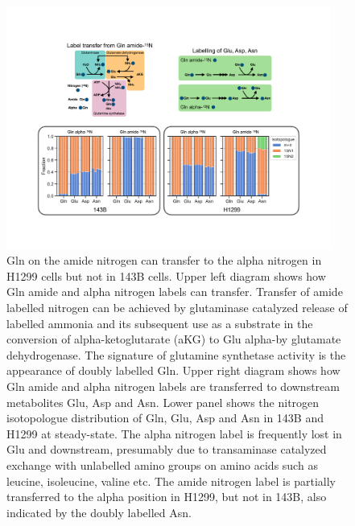 \begin{figure}
    \centering
    \includegraphics[width=0.95\textwidth]{figures/chap2/app/gln_lab_tranfr.pdf}
    \caption[Gln amide to alpha \hNi{} transfer.]{
    Gln \hNi{} on the amide nitrogen can transfer to the alpha nitrogen in H1299 cells but not in 143B cells.
    Upper left diagram shows how Gln amide and alpha nitrogen labels can transfer.
    Transfer of amide labelled nitrogen can be achieved by glutaminase catalyzed release of labelled ammonia and its subsequent use as a substrate in the conversion of alpha-ketoglutarate (aKG) to Glu alpha-\hNi by glutamate dehydrogenase.
    The signature of glutamine synthetase activity is the appearance of doubly labelled Gln.
    Upper right diagram shows how Gln amide and alpha nitrogen labels are transferred to downstream metabolites Glu, Asp and Asn.
    Lower panel shows the nitrogen isotopologue distribution of Gln, Glu, Asp and Asn in 143B and H1299 at steady-state.
    The alpha nitrogen label is frequently lost in Glu and downstream, presumably due to transaminase catalyzed exchange with unlabelled amino groups on amino acids such as leucine, isoleucine, valine etc.
    The amide nitrogen label is partially transferred to the alpha position in H1299, but not in 143B, also indicated by the doubly labelled Asn.
    }
    \label{fig:app_ch2:gln_lab_tranfr}
\end{figure}

